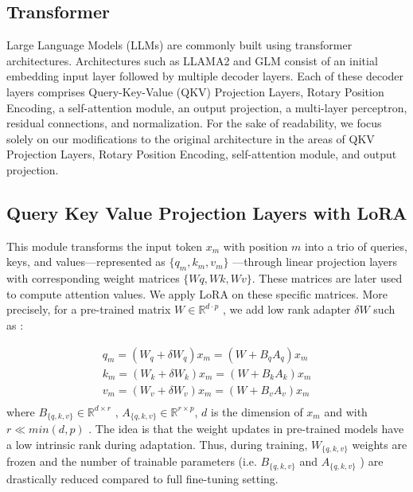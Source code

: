 \subsection{Transformer}

Large Language Models (LLMs) are commonly built using transformer architectures. Architectures such as LLAMA2 \cite{touvron2023llama} and GLM \cite{zeng2022glm} consist of an initial embedding input layer followed by multiple decoder layers. Each of these decoder layers comprises Query-Key-Value (QKV) Projection Layers, Rotary Position Encoding, a self-attention module, an output projection, a multi-layer perceptron, residual connections, and normalization. For the sake of readability, we focus solely on our modifications to the original architecture in the areas of QKV Projection Layers, Rotary Position Encoding, self-attention module, and output projection.

\subsection{Query Key Value Projection Layers with LoRA} 
\label{sec:qkvLoRA}
This module transforms the input token $x_m$ with position $m$ into a trio of queries, keys, and values—represented as $\{q_m, k_m, v_m\}$ —through linear projection layers with corresponding weight matrices $\{Wq , Wk , Wv\}$. These matrices are later used to compute attention values. We apply LoRA on these specific matrices. More precisely, for a pre-trained matrix $W \in \mathbb{R}^{d\cdot p}$ , we add low rank adapter $\delta W$ such as :

\begin{equation}
\begin{split}
q_m = (W_q+\delta W_q)x_m = (W + B_q A_q)x_m \\
k_m = (W_k+\delta W_k)x_m = (W + B_k A_k)x_m \\
v_m = (W_v+\delta W_v)x_m = (W + B_v A_v)x_m \\
\end{split}
\end{equation}
where $B_{\{q,k,v\}} \in \mathbb{R}^{d\times r}$ , $A_{\{q,k,v\}} \in \mathbb{R}^{r\times p}$, $d$ is the dimension of $x_m$ and with $r \ll min(d,p)$ . The idea is that the weight updates in pre-trained models have a low intrinsic rank during adaptation. Thus, during training, $W_{\{q,k,v\}}$ weights are frozen and the number of trainable parameters (i.e. $B_{\{q,k,v\}}$ and $A_{\{q,k,v\}}$ ) are drastically reduced compared to full fine-tuning setting.

